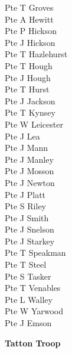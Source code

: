 \begin{multicols}{3}
  Pte T Groves \\
  Pte A Hewitt \\
  Pte P Hickson \\
  Pte J Hickson \\
  Pte T Hazlehurst \\
  Pte T Hough \\
  Pte J Hough \\
  Pte T Hurst \\
  Pte J Jackson \\
  Pte T Kynsey \\
  Pte W Leicester \\
  Pte J Lea \\
  Pte J Mann \\
  Pte J Manley \\
  Pte J Mosson \\
  Pte J Newton \\
  Pte J Platt \\
  Pte S Riley \\
  Pte J Smith \\
  Pte J Snelson \\
  Pte J Starkey \\
  Pte T Speakman \\
  Pte T Steel \\
  Pte S Tasker \\
  Pte T Venables \\
  Pte L Walley \\
  Pte W Yarwood \\
  Pte J Emson \\
\end{multicols}

\begin{center}
  \Large
  \textbf{Tatton Troop}
\end{center}

